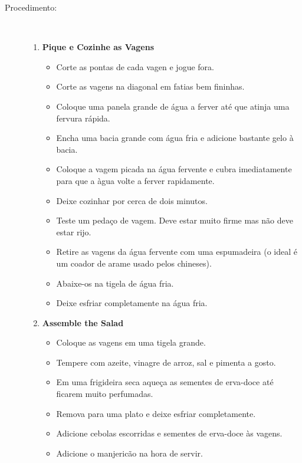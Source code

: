 \documentclass [11pt, letterpaper] {article}
\begin{document}
\begin {description}
\item [Procedimento:] \ \\
\begin {enumerate}
\item {\bf Pique e Cozinhe as Vagens}
\begin {itemize}
\item Corte as pontas de cada vagen e jogue fora.
\item Corte as vagens na diagonal em fatias bem fininhas. 
\item Coloque uma panela  grande de água a ferver at\'e que atinja uma fervura rápida.
\item Encha uma bacia grande com água fria e adicione bastante gelo à bacia.
\item Coloque a vagem picada na água fervente e cubra imediatamente para que a \`agua volte a ferver rapidamente.
\item Deixe cozinhar por cerca de dois minutos.
\item Teste um pedaço de vagem. Deve estar muito firme mas n\~ao deve estar rijo.
\item Retire as vagens da água fervente com uma espumadeira (o ideal \'e um coador de arame usado pelos chineses).
\item Abaixe-os na tigela de água fria.
\item Deixe esfriar completamente na água fria.
\end {itemize}
\item {\bf Assemble the Salad}
\begin {itemize}
\item Coloque as vagens em uma tigela grande.
\item Tempere com azeite, vinagre de arroz, sal e pimenta a gosto.
\item Em uma frigideira seca aqueça as sementes de erva-doce até ficarem muito perfumadas.
\item Remova para uma plato e deixe esfriar completamente.
\item Adicione cebolas escorridas e sementes de erva-doce \`as vagens.
\item Adicione o manjeric\~ao na hora de servir.
\end {itemize}
\end {enumerate}
\end {description}
\end{document}

